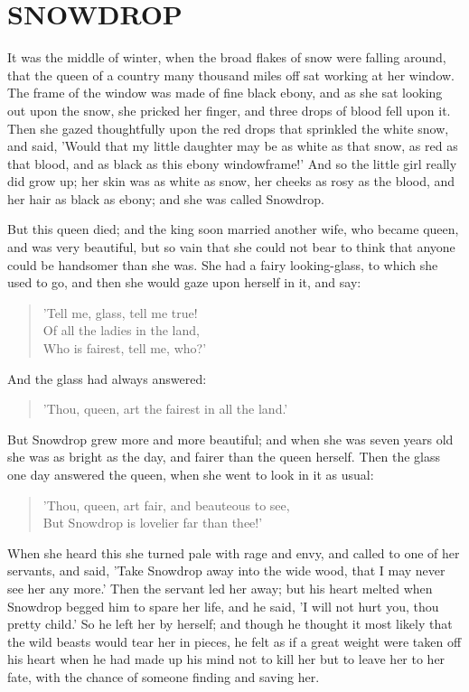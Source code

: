 \documentclass[12pt]{book}
\begin{document}
\chapter{SNOWDROP}

It was the middle of winter, when the broad flakes of snow were
falling around, that the queen of a country many thousand miles off
sat working at her window. The frame of the window was made of fine
black ebony, and as she sat looking out upon the snow, she pricked her
finger, and three drops of blood fell upon it. Then she gazed
thoughtfully upon the red drops that sprinkled the white snow, and
said, 'Would that my little daughter may be as white as that snow, as
red as that blood, and as black as this ebony windowframe!' And so the
little girl really did grow up; her skin was as white as snow, her
cheeks as rosy as the blood, and her hair as black as ebony; and she
was called Snowdrop.

But this queen died; and the king soon married another wife, who
became queen, and was very beautiful, but so vain that she could not
bear to think that anyone could be handsomer than she was. She had a
fairy looking-glass, to which she used to go, and then she would gaze
upon herself in it, and say:

\begin{verse}
 'Tell me, glass, tell me true!\\
  Of all the ladies in the land,\\
  Who is fairest, tell me, who?'
\end{verse}

And the glass had always answered:

\begin{verse}
 'Thou, queen, art the fairest in all the land.'
\end{verse}

But Snowdrop grew more and more beautiful; and when she was seven
years old she was as bright as the day, and fairer than the queen
herself. Then the glass one day answered the queen, when she went to
look in it as usual:

\begin{verse}
 'Thou, queen, art fair, and beauteous to see,\\
  But Snowdrop is lovelier far than thee!'
\end{verse}

When she heard this she turned pale with rage and envy, and called to
one of her servants, and said, 'Take Snowdrop away into the wide wood,
that I may never see her any more.' Then the servant led her away; but
his heart melted when Snowdrop begged him to spare her life, and he
said, 'I will not hurt you, thou pretty child.' So he left her by
herself; and though he thought it most likely that the wild beasts
would tear her in pieces, he felt as if a great weight were taken off
his heart when he had made up his mind not to kill her but to leave
her to her fate, with the chance of someone finding and saving her.
\end{document}
